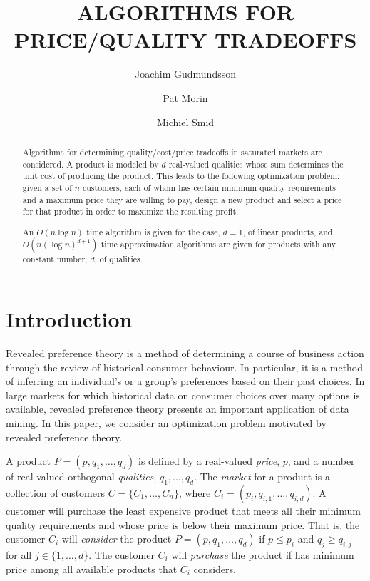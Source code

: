 \documentclass[lotsofwhite]{patmorin}
\title{\MakeUppercase{Algorithms for Price/Quality Tradeoffs}}
\author{Joachim Gudmundsson%
	\and Pat Morin%
	\and Michiel Smid}
\begin{document}
\maketitle
\begin{abstract}
Algorithms for determining quality/cost/price tradeoffs in saturated
markets are considered.  A product is modeled by $d$ real-valued
qualities whose sum determines the unit cost of producing the product.
This leads to the following optimization problem: given a set of $n$
customers, each of whom has certain minimum quality requirements and a
maximum price they are willing to pay, design a new product and select
a price for that product in order to maximize the resulting profit.

An $O(n\log n)$ time algorithm is given for the case, $d=1$, of linear
products, and $O(n(\log n)^{d+1})$ time approximation algorithms are
given for products with any constant number, $d$, of qualities.
\end{abstract}

\section{Introduction}

Revealed preference theory \cite{v06} is a method of determining a course
of business action through the review of historical consumer behaviour.  In
particular, it is a method of inferring an individual's or a group's
preferences based on their past choices.  In large markets for which
historical data on consumer choices over many options is available,
revealed preference theory presents an important application of data
mining.  In this paper, we consider an optimization problem motivated by
revealed preference theory.

A product $P=(p,q_1,\ldots,q_d)$ is defined by a real-valued \emph{price},
$p$, and a number of real-valued orthogonal \emph{qualities},
$q_1,\ldots,q_d$.  The \emph{market} for a product is a collection of
customers $C=\{C_1,\ldots,C_n\}$, where $C_i=(p_i,q_{i,1},\ldots,q_{i,d})$.
A customer will purchase the least expensive product that meets all their
minimum quality requirements and whose price is below their maximum price.
That is, the customer $C_i$ will \emph{consider} the product
$P=(p,q_1,\ldots,q_d)$ if $p \le p_i$ and $q_j \ge q_{i,j}$ for all
$j\in\{1,\ldots,d\}$.  The customer $C_i$ will \emph{purchase} the product
if has minimum price among all available products that $C_i$ considers.
\end{document}
